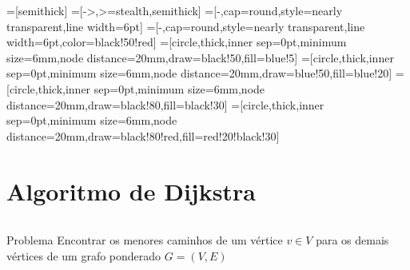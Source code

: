 \begin{comment}

\documentclass{beamer}
\usepackage[latin1]{inputenc}
\usepackage[T1]{fontenc}
\usepackage[frenchb]{babel}

\usepackage{tikz}




\usetheme{Darmstadt}
\end{comment}






=[semithick] %
=[->,>=stealth,semithick] %
=[-,cap=round,style=nearly transparent,line width=6pt] %
=[-,cap=round,style=nearly transparent,line width=6pt,color=black!50!red]
 =[circle,thick,inner sep=0pt,minimum size=6mm,node distance=20mm,draw=black!50,fill=blue!5]
=[circle,thick,inner sep=0pt,minimum size=6mm,node distance=20mm,draw=blue!50,fill=blue!20]
   =[circle,thick,inner sep=0pt,minimum size=6mm,node distance=20mm,draw=black!80,fill=black!30]
  =[circle,thick,inner sep=0pt,minimum size=6mm,node distance=20mm,draw=black!80!red,fill=red!20!black!30]
\section*{Algoritmo de Dijkstra}

\begin{frame}
	\begin{columns}
	\begin{block}{Problema}
		Encontrar os menores caminhos de um vértice $v \in V$ para os demais vértices de um grafo ponderado $G=(V,E)$
	\end{block}
		
	\end{columns}
\end{frame}

